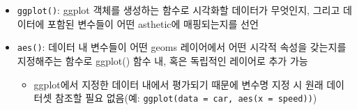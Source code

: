 \documentclass[
  11pt,
]{krantz}
\providecommand{\tightlist}{%
  \setlength{\itemsep}{0pt}\setlength{\parskip}{0pt}}
\begin{document}
\begin{itemize}
\tightlist
\item
  \texttt{ggplot()}: ggplot 객체를 생성하는 함수로 시각화할 데이터가 무엇인지, 그리고 데이터에 포함된 변수들이 어떤 asthetic에 매핑되는지를 선언
\item
  \texttt{aes()}: 데이터 내 변수들이 어떤 geoms 레이어에서 어떤 시각적 속성을 갖는지를 지정해주는 함수로 ggplot() 함수 내, 혹은 독립적인 레이어로 추가 가능

  \begin{itemize}
  \tightlist
  \item
    ggplot에서 지정한 데이터 내에서 평가되기 때문에 변수명 지정 시 원래 데이터셋 참조할 필요 없음(예: \texttt{ggplot(data\ =\ car,\ aes(x\ =\ speed))})
  \end{itemize}
\end{itemize}

\footnotesize
\end{document}
